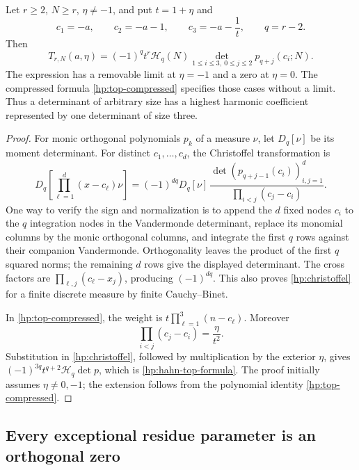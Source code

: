 \begin{theorem}\label{hp:hahn-top}
Let $r\ge2$, $N\ge r$, $\eta\ne-1$, and put $t=1+\eta$ and
\[
 c_1=-a,\qquad c_2=-a-1,\qquad c_3=-a-\frac1t,\qquad q=r-2.
\]
Then
\begin{equation}\label{hp:hahn-top-formula}
 \boxed{\displaystyle
 T_{r,N}(a,\eta)
   =(-1)^q t^r\mathcal H_q(N)
           \det_{1\le i\le3,\ 0\le j\le2}
                         p_{q+j}(c_i;N).}
\end{equation}
The expression has a removable limit at $\eta=-1$ and a zero at
$\eta=0$. The compressed formula \eqref{hp:top-compressed}
specifies those cases without a limit. Thus a determinant of
arbitrary size has a highest harmonic coefficient represented by
one determinant of size three.
\end{theorem}
\begin{proof}
For monic orthogonal polynomials $p_k$ of a measure $\nu$, let
$D_q[\nu]$ be its moment determinant. For distinct $c_1,\ldots,c_d$,
the Christoffel transformation is
\begin{equation}\label{hp:christoffel}
 D_q\!\left[\prod_{\ell=1}^d(x-c_\ell)\nu\right]
 =(-1)^{dq}D_q[\nu]\,
       \frac{\det(p_{q+j-1}(c_i))_{i,j=1}^d}
            {\prod_{i<j}(c_j-c_i)}.
\end{equation}
One way to verify the sign and normalization is to append the
$d$ fixed nodes $c_i$ to the $q$ integration nodes in the
Vandermonde determinant, replace its monomial columns by the
monic orthogonal columns, and integrate the first $q$ rows
against their companion Vandermonde. Orthogonality leaves the
product of the first $q$ squared norms; the remaining $d$ rows
give the displayed determinant. The cross factors are
$\prod_{\ell,j}(c_\ell-x_j)$, producing $(-1)^{dq}$.
This also proves \eqref{hp:christoffel} for a finite discrete
measure by finite Cauchy--Binet.

In \eqref{hp:top-compressed}, the weight is
$t\prod_{\ell=1}^3(n-c_\ell)$. Moreover
\[
 \prod_{i<j}(c_j-c_i)=\frac{\eta}{t^2}.
\]
Substitution in \eqref{hp:christoffel}, followed by multiplication
by the exterior $\eta$, gives
$(-1)^{3q}t^{q+2}\mathcal H_q\det p$, which is
\eqref{hp:hahn-top-formula}. The proof initially assumes
$\eta\ne0,-1$; the extension follows from the polynomial
identity \eqref{hp:top-compressed}.
\end{proof}

\subsection{Every exceptional residue parameter is an orthogonal zero}

